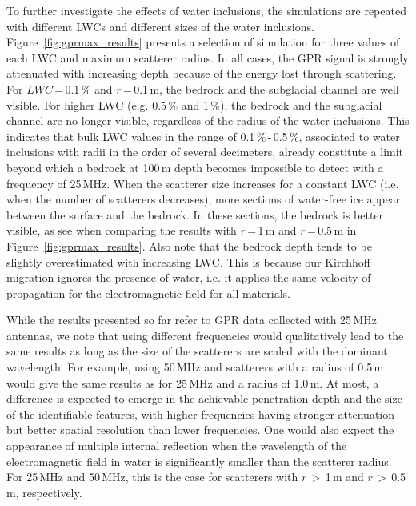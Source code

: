 To further investigate the effects of water inclusions, the simulations are repeated with different LWCs and different sizes of the water inclusions. Figure~\ref{fig:gprmax_results} presents a selection of simulation for three values of each LWC and maximum scatterer radius. In all cases, the GPR signal is strongly attenuated with increasing depth because of the energy lost through scattering. For $LWC$\,=\,0.1\,\% and $r$\,=\,0.1\,m, the bedrock and the subglacial channel are well visible. For higher LWC (e.g. 0.5\,\% and 1\,\%), the bedrock and the subglacial channel are no longer visible, regardless of the radius of the water inclusions. This indicates that bulk LWC values in the range of 0.1\,\%\,-\,0.5\,\%, associated to water inclusions with radii in the order of several decimeters, already constitute a limit beyond which a bedrock at 100\,m depth becomes impossible to detect with a frequency of 25\,MHz. When the scatterer size increases for a constant LWC (i.e. when the number of scatterers decreases), more sections of water-free ice appear between the surface and the bedrock. In these sections, the bedrock is better visible, as see when comparing the results with $r$\,=\,1\,m and $r$\,=\,0.5\,m in Figure~\ref{fig:gprmax_results}.
Also note that the bedrock depth tends to be slightly overestimated with increasing LWC. This is because our Kirchhoff migration ignores the presence of water, i.e. it applies the same velocity of propagation for the electromagnetic field for all materials.

While the results presented so far refer to GPR data collected with 25\,MHz antennas, we note that using different frequencies would qualitatively lead to the same results as long as the size of the scatterers are scaled with the dominant wavelength. For example, using 50\,MHz and scatterers with a radius of 0.5\,m would give the same results as for 25\,MHz and a radius of 1.0\,m. At most, a difference is expected to emerge in the achievable penetration depth and the size of the identifiable features, with higher frequencies having stronger attenuation but better spatial resolution than lower frequencies. One would also expect the appearance of multiple internal reflection when the wavelength of the electromagnetic field in water is significantly smaller than the scatterer radius. For 25\,MHz and 50\,MHz, this is the case for scatterers with $r$\,$>$\,1\,m and $r$\,$>$\,0.5\,m, respectively.


